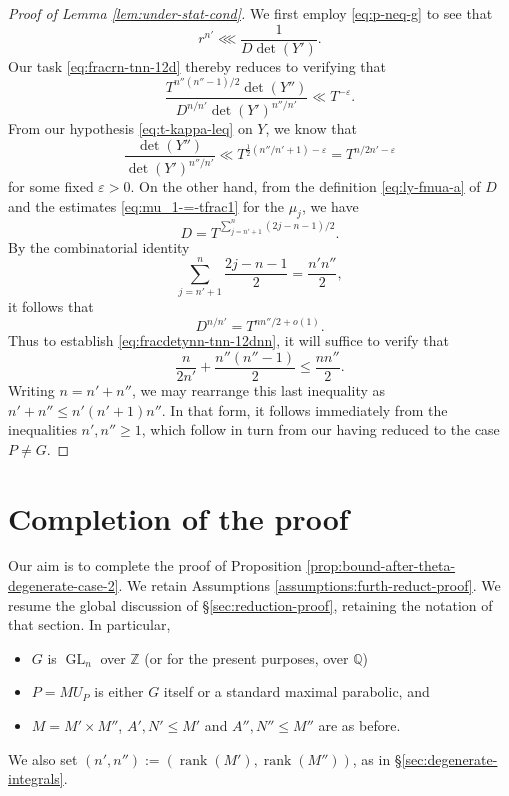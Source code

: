 \documentclass[reqno]{amsart}
\DeclareMathOperator{\GL}{GL}
\def\eps{\varepsilon}
\DeclareMathOperator{\rank}{rank}
\theoremstyle{plain} \newtheorem{theorem} {Theorem}
\theoremstyle{definition} \newtheorem{definition} [theorem] {Definition}
\theoremstyle{itplain} %
\numberwithin{equation}{section}
\numberwithin{theorem}{section}
\renewcommand{\geq}{\geqslant}
\renewcommand{\leq}{\leqslant}
\begin{document}
\begin{proof}[Proof of Lemma \ref{lem:under-stat-cond}]
  We first employ \eqref{eq:p-neq-g} to see that
  \begin{equation*}
    r^{n'} \lll \frac{1}{D \det(Y')}.
  \end{equation*}
  Our task \eqref{eq:fracrn-tnn-12d} thereby reduces to verifying that
  \begin{equation}\label{eq:fracdetynn-tnn-12dnn}
    \frac{T^{n''(n''-1)/2} \det (Y'') }{D^{n/n'} \det(Y')^{n''/n'}  }
    \ll T^{-\eps}.
  \end{equation}
  From our hypothesis \eqref{eq:t-kappa-leq} on $Y$, we know that
  \begin{equation*}
    \frac{\det(Y'')}{\det(Y')^{n''/n'}} \ll
    T^{\frac{1}{2} (n'' / n' + 1) - \eps }
    =
    T^{n/2 n' - \eps }
  \end{equation*}
  for some fixed $\eps > 0$.  On the other hand, from the definition \eqref{eq:ly-fmua-a} of $D$ and the estimates \eqref{eq:mu_1-=-tfrac1} for the $\mu_j$, we have
  \begin{equation*}
    D = T^{\sum_{j=n'+1}^{n} (2 j - n - 1)/2}.
  \end{equation*}
  By the combinatorial identity
  \begin{equation*}
    \sum_{j=n'+1}^{n}
    \frac{2j -n - 1}{2} =
    \frac{n ' n''}{2},
  \end{equation*}
  it follows that
  \begin{equation*}
    D^{n / n'} =
    T^{n n''/2 + o(1)}.
  \end{equation*}
  Thus to establish \eqref{eq:fracdetynn-tnn-12dnn}, it will suffice to verify that
  \begin{equation*}
    \frac{n}{2 n'}
    +
    \frac{n'' (n''-1)}{2}
    \leq
    \frac{n n''}{2}.
  \end{equation*}
  Writing $n = n' + n''$, we may rearrange this last inequality as $n' + n'' \leq n' (n' + 1) n''$.  In that form, it follows immediately from the inequalities $n', n'' \geq 1$, which follow in turn from our having reduced to the case $P \neq G$.
\end{proof}
\section{Completion of the proof}\label{sec:completion-proof-1}
Our aim is to complete the proof of Proposition \ref{prop:bound-after-theta-degenerate-case-2}.
We retain Assumptions \ref{assumptions:furth-reduct-proof}.  We resume the global discussion of \S\ref{sec:reduction-proof}, retaining the notation of that section.  In particular,
\begin{itemize}
\item $G$ is $\GL_n$ over $\mathbb{Z}$ (or for the present purposes, over $\mathbb{Q}$) 
\item $P = M U_P$ is either $G$ itself or a standard maximal parabolic, and
\item $M = M' \times M''$, $A', N' \leq M'$ and $A'', N'' \leq M''$ are as before.
\end{itemize}
We also set $(n', n'') := (\rank(M'), \rank(M''))$, as in \S\ref{sec:degenerate-integrals}.
\end{document}
